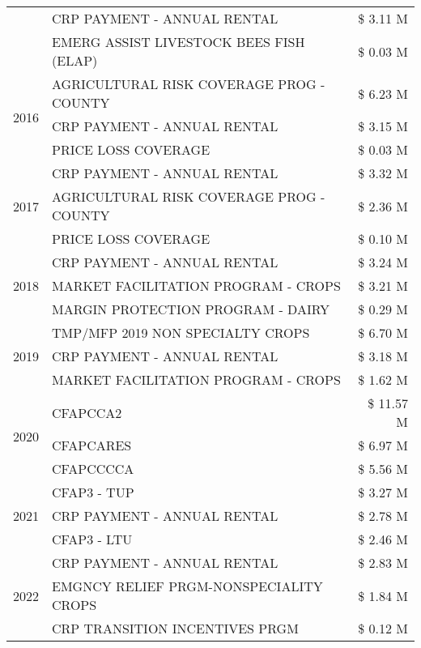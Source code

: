\begin{tabular}{llr}
 & CRP PAYMENT - ANNUAL RENTAL & \$ 3.11 M \\
 & EMERG ASSIST LIVESTOCK BEES FISH (ELAP) & \$ 0.03 M \\
\cline{1-3}
\multirow[t]{3}{*}{2016} & AGRICULTURAL RISK COVERAGE PROG - COUNTY & \$ 6.23 M \\
 & CRP PAYMENT - ANNUAL RENTAL & \$ 3.15 M \\
 & PRICE LOSS COVERAGE & \$ 0.03 M \\
\cline{1-3}
\multirow[t]{3}{*}{2017} & CRP PAYMENT - ANNUAL RENTAL & \$ 3.32 M \\
 & AGRICULTURAL RISK COVERAGE PROG - COUNTY & \$ 2.36 M \\
 & PRICE LOSS COVERAGE & \$ 0.10 M \\
\cline{1-3}
\multirow[t]{3}{*}{2018} & CRP PAYMENT - ANNUAL RENTAL & \$ 3.24 M \\
 & MARKET FACILITATION PROGRAM - CROPS & \$ 3.21 M \\
 & MARGIN PROTECTION PROGRAM - DAIRY & \$ 0.29 M \\
\cline{1-3}
\multirow[t]{3}{*}{2019} & TMP/MFP 2019 NON SPECIALTY CROPS & \$ 6.70 M \\
 & CRP PAYMENT - ANNUAL RENTAL & \$ 3.18 M \\
 & MARKET FACILITATION PROGRAM - CROPS & \$ 1.62 M \\
\cline{1-3}
\multirow[t]{3}{*}{2020} & CFAPCCA2 & \$ 11.57 M \\
 & CFAPCARES & \$ 6.97 M \\
 & CFAPCCCCA & \$ 5.56 M \\
\cline{1-3}
\multirow[t]{3}{*}{2021} & CFAP3 - TUP & \$ 3.27 M \\
 & CRP PAYMENT - ANNUAL RENTAL & \$ 2.78 M \\
 & CFAP3 - LTU & \$ 2.46 M \\
\cline{1-3}
\multirow[t]{3}{*}{2022} & CRP PAYMENT - ANNUAL RENTAL & \$ 2.83 M \\
 & EMGNCY RELIEF PRGM-NONSPECIALITY CROPS & \$ 1.84 M \\
 & CRP TRANSITION INCENTIVES PRGM & \$ 0.12 M \\
\cline{1-3}
\bottomrule
\end{tabular}
